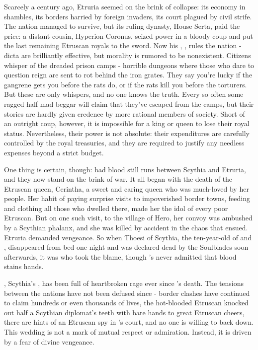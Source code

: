 \documentclass[blue]{Kos}
\begin{document}
Scarcely a century ago, Etruria seemed on the brink of collapse: its economy in shambles, its borders harried by foreign invaders, its court plagued by civil strife. The nation managed to survive, but its ruling dynasty, House Serta, paid the price: a distant cousin, Hyperion Coronus, seized power in a bloody coup and put the last remaining Etruscan royals to the sword. Now his \cEtruriaKing{\offspring}, \cEtruriaKing{}, rules the nation - \cEtruriaKing{\their} dicta are brilliantly effective, but \cEtruriaKing{\their} morality is rumored to be nonexistent. Citizens whisper of the dreaded prison camps - horrible dungeons where those who dare to question \cEtruriaKing{\their} reign are sent to rot behind the iron grates. They say you're lucky if the gangrene gets you before the rats do, or if the rats kill you before the torturers. But these are only whispers, and no one knows the truth. Every so often some ragged half-mad beggar will claim that they've escaped from the camps, but their stories are hardly given credence by more rational members of society. Short of an outright coup, however, it is impossible for a king or queen to lose their royal status. Nevertheless, their power is not absolute: their expenditures are carefully controlled by the royal treasuries, and they are required to justify any needless expenses beyond a strict budget.

One thing is certain, though: bad blood still runs between Scythia and Etruria, and they now stand on the brink of war. It all began with the death of the Etruscan queen, Cerintha, a sweet and caring queen who was much-loved by her people. Her habit of paying surprise visits to impoverished border towns, feeding and clothing all those who dwelled there, made her the idol of every poor Etruscan. But on one such visit, to the village of Hero, her convoy was ambushed by a Scythian phalanx, and she was killed by accident in the chaos that ensued. Etruria demanded vengeance. So when \cFugitive{\Prince} Thoesi of Scythia, the ten-year-old \cFugitive{\offspring} of \cScythiaKing{\Monarch} \cScythiaKing{} and \cScythiaQueen{\Monarch} \cScythiaQueen{}, disappeared from \cFugitive{\their} bed one night and was declared dead by the Soulblades soon afterwards, it was \cEtruriaKing{} who took the blame, though \cEtruriaKing{\they}’s never admitted that \cFugitive{\their} blood stains \cEtruriaKing{\their} hands.

\cScythiaQueen{}, Scythia's \cScythiaQueen{\monarch}, has been full of heartbroken rage ever since \cScythiaQueen{\their} \cFugitive{\offspring}'s death. The tensions between the nations have not been defused since - border clashes have continued to claim hundreds or even thousands of lives, the hot-blooded Etruscan \cPoet{\prince} \cPoet{} knocked out half a Scythian diplomat's teeth with \cPoet{\their} bare hands to great Etruscan cheers, there are hints of an Etruscan spy in \cScythiaKing{\Monarch} \cScythiaKing{}'s court, and no one is willing to back down. This wedding is not a mark of mutual respect or admiration. Instead, it is driven by a fear of divine vengeance.
\end{document}
